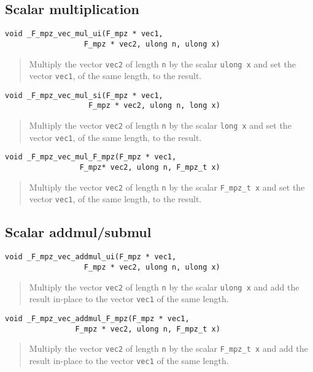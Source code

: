 \documentclass[a4paper,10pt]{article}
\newcommand{\code}{\lstinline}
\begin{document}
\subsection{Scalar multiplication}

\begin{lstlisting}
void _F_mpz_vec_mul_ui(F_mpz * vec1, 
                  F_mpz * vec2, ulong n, ulong x)
\end{lstlisting}
\begin{quote}
Multiply the vector \code{vec2} of length \code{n} by the scalar \code{ulong x} and set the vector 
\code{vec1}, of the same length, to the result.
\end{quote}

\begin{lstlisting}
void _F_mpz_vec_mul_si(F_mpz * vec1, 
                   F_mpz * vec2, ulong n, long x)
\end{lstlisting}
\begin{quote}
Multiply the vector \code{vec2} of length \code{n} by the scalar \code{long x} and set the vector 
\code{vec1}, of the same length, to the result.
\end{quote}

\begin{lstlisting}
void _F_mpz_vec_mul_F_mpz(F_mpz * vec1, 
                 F_mpz* vec2, ulong n, F_mpz_t x)
\end{lstlisting}
\begin{quote}
Multiply the vector \code{vec2} of length \code{n} by the scalar \code{F_mpz_t x} and set the vector 
\code{vec1}, of the same length, to the result.
\end{quote}

\subsection{Scalar addmul/submul}

\begin{lstlisting}
void _F_mpz_vec_addmul_ui(F_mpz * vec1, 
                  F_mpz * vec2, ulong n, ulong x)
\end{lstlisting}
\begin{quote}
Multiply the vector \code{vec2} of length \code{n} by the scalar \code{ulong x} and add the result
in-place to the vector \code{vec1} of the same length.
\end{quote}

\begin{lstlisting}
void _F_mpz_vec_addmul_F_mpz(F_mpz * vec1, 
                F_mpz * vec2, ulong n, F_mpz_t x)
\end{lstlisting}
\begin{quote}
Multiply the vector \code{vec2} of length \code{n} by the scalar \code{F_mpz_t x} and add the result
in-place to the vector \code{vec1} of the same length.
\end{quote}
\end{document}
